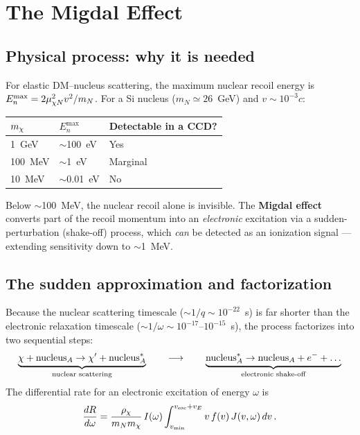 \section{The Migdal Effect}
\label{sec:migdal}

\subsection{Physical process: why it is needed}

For elastic DM--nucleus scattering, the maximum nuclear recoil energy is
$E_n^\mathrm{max} = 2\mu_{\chi N}^2 v^2/m_N$. For a Si nucleus ($m_N\simeq26$~GeV)
and $v\sim10^{-3}c$:

\begin{center}
\begin{tabular}{@{}lll@{}}
\toprule
$m_\chi$ & $E_n^\mathrm{max}$ & Detectable in a CCD? \\
\midrule
1~GeV & $\sim$100~eV & Yes \\
100~MeV & $\sim$1~eV & Marginal \\
10~MeV & $\sim$0.01~eV & No \\
\bottomrule
\end{tabular}
\end{center}

Below $\sim$100~MeV, the nuclear recoil alone is invisible. The
\textbf{Migdal effect} converts part of the recoil momentum into an
\emph{electronic} excitation via a sudden-perturbation (shake-off) process,
which \emph{can} be detected as an ionization signal — extending
sensitivity down to $\sim$1~MeV.

\subsection{The sudden approximation and factorization}

Because the nuclear scattering timescale ($\sim1/q\sim10^{-22}$~s) is far
shorter than the electronic relaxation timescale
($\sim1/\omega\sim10^{-17}$--$10^{-15}$~s), the process factorizes into two
sequential steps:
\[
\underbrace{\chi + \text{nucleus}_A \to \chi' + \text{nucleus}_A^*}_{\text{nuclear scattering}}
\qquad\longrightarrow\qquad
\underbrace{\text{nucleus}_A^* \to \text{nucleus}_A + e^- + \ldots}_{\text{electronic shake-off}}
\]
The differential rate for an electronic excitation of energy $\omega$ is
\begin{equation}
\frac{dR}{d\omega} = \frac{\rho_\chi}{m_N m_\chi}\, I(\omega)
\int_{v_\mathrm{min}}^{v_\mathrm{esc}+v_E} v\,f(v)\,J(v,\omega)\, dv\,.
\end{equation}

